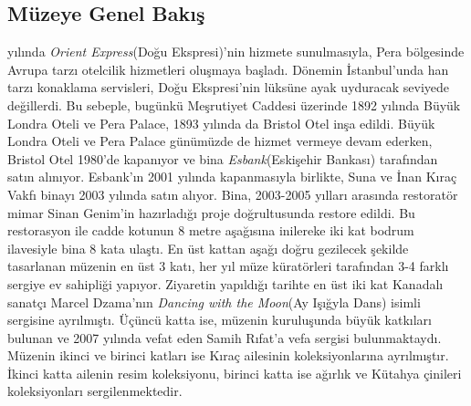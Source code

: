 \subsection{Müzeye Genel Bakış}
\indent{} yılında \textit{Orient Express}(Doğu Ekspresi)'nin hizmete sunulmasıyla, Pera bölgesinde Avrupa tarzı otelcilik hizmetleri oluşmaya başladı. Dönemin İstanbul'unda han tarzı konaklama servisleri, Doğu Ekspresi'nin lüksüne ayak uyduracak seviyede değillerdi. Bu sebeple, bugünkü Meşrutiyet Caddesi üzerinde 1892 yılında Büyük Londra Oteli ve Pera Palace, 1893 yılında da Bristol Otel inşa edildi. Büyük Londra Oteli ve Pera Palace günümüzde de hizmet vermeye devam ederken, Bristol Otel 1980'de kapanıyor ve bina \textit{Esbank}(Eskişehir Bankası) tarafından satın alınıyor. Esbank'ın 2001 yılında kapanmasıyla birlikte, Suna ve İnan Kıraç Vakfı binayı 2003 yılında satın alıyor. Bina, 2003-2005 yılları arasında restoratör mimar Sinan Genim'in hazırladığı proje doğrultusunda restore edildi. Bu restorasyon ile cadde kotunun 8 metre aşağısına inilereke iki kat bodrum ilavesiyle bina 8 kata ulaştı.\newline
\indent En üst kattan aşağı doğru gezilecek şekilde tasarlanan müzenin en üst 3 katı, her yıl müze küratörleri tarafından 3-4 farklı sergiye ev sahipliği yapıyor. Ziyaretin yapıldığı tarihte en üst iki kat Kanadalı sanatçı Marcel Dzama'nın \textit{Dancing with the Moon}(Ay Işığyla Dans) isimli sergisine ayrılmıştı. Üçüncü katta ise, müzenin kuruluşunda büyük katkıları bulunan ve 2007 yılında vefat eden Samih Rıfat'a vefa sergisi bulunmaktaydı. Müzenin ikinci ve birinci katları ise Kıraç ailesinin koleksiyonlarına ayrılmıştır. İkinci katta ailenin resim koleksiyonu, birinci katta ise ağırlık ve Kütahya çinileri koleksiyonları sergilenmektedir. 